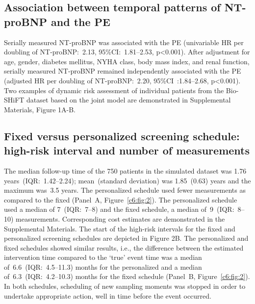 \subsection{Association between temporal patterns of NT-proBNP and the PE}
Serially measured NT-proBNP was associated with the PE (univariable HR per doubling of NT-proBNP:~2.13, 95\%CI:~1.81--2.53, p<0.001). After adjustment for age, gender, diabetes mellitus, NYHA class, body mass index, and renal function, serially measured NT-proBNP remained independently associated with the PE (adjusted HR per doubling of NT-proBNP:~2.20, 95\%CI~:1.84--2.68, p<0.001). Two examples of dynamic risk assessment of individual patients from the Bio-SHiFT dataset based on the joint model are demonstrated in Supplemental Materials, Figure 1A-B. 

\subsection{Fixed versus personalized screening schedule: high-risk interval and number of measurements}
The median follow-up time of the 750 patients in the simulated dataset was 1.76 years~(IQR:~1.42--2.24); mean~(standard deviation) was 1.85~(0.63) years and the maximum was~3.5 years. The personalized schedule used fewer measurements as compared to the fixed (Panel~A, Figure~\ref{c6:fig:2}). The personalized schedule used a median of 7~(IQR:~7--8) and the fixed schedule, a median of~9~(IQR:~8--10) measurements. Corresponding cost estimates are demonstrated in the Supplemental Materials. The start of the high-risk intervals for the fixed and personalized screening schedules are depicted in Figure 2B. The personalized and fixed schedules showed similar results, i.e., the difference between the estimated intervention time compared to the `true' event time was a median of~6.6~(IQR:~4.5--11.3) months for the personalized and a median of~6.3~(IQR:~4.2--10.3) months for the fixed schedule (Panel~B, Figure~\ref{c6:fig:2}). In both schedules, scheduling of new sampling moments was stopped in order to undertake appropriate action, well in time before the event occurred.

